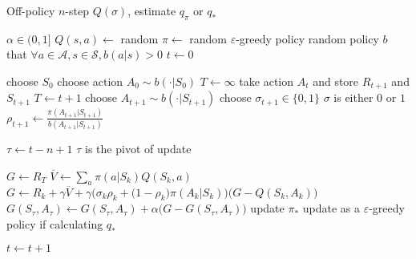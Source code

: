\begin{algorithm}
	\caption{Off-policy $n$-step $Q(\sigma)$, estimate $q_\pi$ or $q_*$}\label{algo:nstepoffrho}	
	
	\begin{algorithmic}[1]
		\State $ \alpha \in (0,1]$
		\State $Q(s,a) \gets$ random
		\State $\pi \gets$ random $\varepsilon$-greedy policy
		\State random policy $b$ that $\forall a\in \mathcal{A}, s\in \mathcal{S}, b(a|s) > 0$
		\State $t \gets 0$
		
		\Statex
		
		\Loop
			\State choose $S_0$
			\State choose action $A_0 \sim b (\cdot | S_0)$
			\State $T \gets \infty$
					\State take action $A_t$ and store $R_{t+1}$ and $S_{t+1}$
						\State $T \gets t+1$
					\Else
						\State choose $A_{t+1} \sim b(\cdot|S_{t+1})$
						\State choose $\sigma_{t+1} \in \{ 0, 1\}$ \Comment $\sigma$ is either $0$ or $1$
						\State $\rho_{t+1} \gets \frac{\pi(A_{t+1}|S_{t+1})}{b(A_{t+1}|S_{t+1})}$
					\EndIf
				\EndIf
				
				\State $\tau \gets t - n + 1$ \Comment $\tau$ is the pivot of update
				
							\State $G \gets R_T$
						\Else
							\State $\overline{V} \gets \sum\limits_a \pi(a|S_{k})Q(S_{k},a)$
							\State $G \gets R_{k} + \gamma \overline{V} + \gamma \Big ( \sigma_{k} \rho_{k} + \big(1-\rho_{k})\pi(A_{k}|S_{k}) \Big) \Big(G -Q(S_{k},A_{k}) \Big  )$
						\EndIf
					\EndFor
					\State $G(S_\tau,A_\tau) \gets G(S_\tau,A_\tau) + \alpha \Big(G - G(S_\tau,A_\tau)\Big)$
					\State update $\pi_*$ \Comment update as a $\varepsilon$-greedy policy if calculating $q_*$
				\EndIf

				\State $t \gets t+1$
			\EndWhile
		\EndLoop
	\end{algorithmic}
\end{algorithm}

